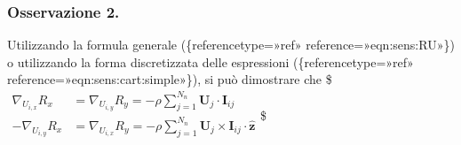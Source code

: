 \documentclass[letterpaper,10pt,italian]{jupyterBook}
\begin{document}
\subsubsection{Osservazione 2.}
\label{\detokenize{polimi/fluidmechanics-ita/template/capitoli/04_bilanci/0401SciaExp:osservazione-2}}
\sphinxAtStartPar
Utilizzando la formula generale
(\{reference\sphinxhyphen{}type=»ref»
reference=»eqn:sens:RU»\}) o utilizzando la forma discretizzata delle
espressioni
(\{reference\sphinxhyphen{}type=»ref»
reference=»eqn:sens:cart:simple»\}), si può dimostrare che
\$\(\begin{aligned}
 \nabla_{U_{i,x}} R_x & = \nabla_{U_{i,y}} R_y = - \rho \displaystyle\sum_{j=1}^{N_n} \bm{U}_{j} \cdot \bm{I}_{ij} \\
 -\nabla_{U_{i,y}} R_x & = \nabla_{U_{i,x}} R_y = - \rho \displaystyle\sum_{j=1}^{N_n} \bm{U}_j  \times \bm{I}_{ij}\cdot \bm{\hat{z}} \\
\end{aligned}\)\$
\end{document}
